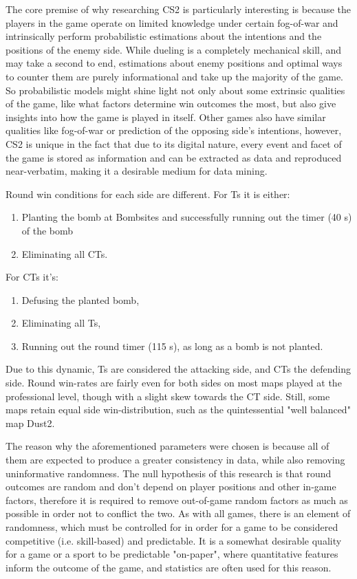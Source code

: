 \documentclass[twoside,11pt]{article}
\begin{document}
The core premise of why researching CS2 is particularly interesting is because the players in the
game operate on limited knowledge under certain fog-of-war and intrinsically perform probabilistic
estimations about the intentions and the positions of the enemy side. While dueling is a completely
mechanical skill, and may take a second to end, estimations about enemy positions and optimal ways
to counter them are purely informational and take up the majority of the game. So probabilistic
models might shine light not only about some extrinsic qualities of the game, like what factors
determine win outcomes the most, but also give insights into how the game is played in itself. Other
games also have similar qualities like fog-of-war or prediction of the opposing side's intentions,
however, CS2 is unique in the fact that due to its digital nature, every event and facet of the game
is stored as information and can be extracted as data and reproduced near-verbatim, making it a
desirable medium for data mining.

Round win conditions for each side are different. For Ts it is either:

\begin{enumerate}
  \item Planting the bomb at Bombsites and successfully running out the timer (40 s) of the bomb
  \item Eliminating all CTs.
\end{enumerate}

For CTs it's:

\begin{enumerate}
  \item Defusing the planted bomb,
  \item Eliminating all Ts,
  \item Running out the round timer (115 s), as long as a bomb is not planted.
\end{enumerate}
Due to this dynamic, Ts are considered the attacking side, and CTs the defending side. Round
win-rates are fairly even for both sides on most maps played at the professional level, though with
a slight skew towards the CT side. Still, some maps retain equal side win-distribution, such as the
quintessential "well balanced" map Dust2.

The reason why the aforementioned parameters were chosen is because all of them are expected to
produce a greater consistency in data, while also removing uninformative randomness. The null
hypothesis of this research is that round outcomes are random and don't depend on player positions
and other in-game factors, therefore it is required to remove out-of-game random factors as much as
possible in order not to conflict the two. As with all games, there is an element of randomness,
which must be controlled for in order for a game to be considered competitive (i.e. skill-based) and
predictable. It is a somewhat desirable quality for a game or a sport to be predictable "on-paper",
where quantitative features inform the outcome of the game, and statistics are often used for this
reason.
\end{document}
